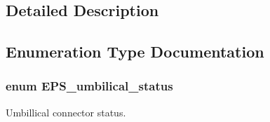 \subsection{Detailed Description}


\subsection{Enumeration Type Documentation}
\hypertarget{group__eps__configuration_gab34d18603569318563da7959d65fb818}{
\subsubsection[{E\-P\-S\-\_\-umbilical\-\_\-status}]{\setlength{\rightskip}{0pt plus 5cm}enum {\bf E\-P\-S\-\_\-umbilical\-\_\-status}}}\label{group__eps__configuration_gab34d18603569318563da7959d65fb818}


Umbillical connector status. 

